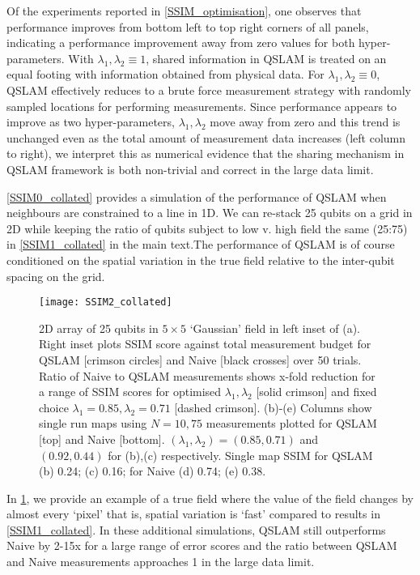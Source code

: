 Of the experiments reported in \cref{SSIM_optimisation}, one observes that performance improves from bottom left to top right corners of all panels, indicating a performance improvement away from zero values for both hyper-parameters.   With $\lambda_1, \lambda_2 \equiv 1$, shared information in QSLAM is treated on an equal footing with information obtained from physical data.  For $\lambda_1, \lambda_2 \equiv 0$, QSLAM effectively reduces to a brute force measurement strategy with randomly sampled locations for performing measurements. Since performance appears to improve as two hyper-parameters, $\lambda_1, \lambda_2$ move away from zero and this trend is unchanged even as the total amount of measurement data increases (left column to right), we interpret this as numerical evidence that the sharing mechanism in QSLAM framework is both non-trivial and correct in the large data limit. 

\cref{SSIM0_collated} provides a simulation of the performance of QSLAM when neighbours are constrained to a line in 1D. We can re-stack 25 qubits on a grid in 2D while keeping the ratio of qubits subject to low v. high field the same (25:75) in \cref{SSIM1_collated} in the main text.The performance of QSLAM is of course conditioned on the  spatial variation in the true field relative to the inter-qubit spacing on the grid.

\begin{figure}
	\texttt{[image: SSIM2\_collated]}
	\caption{\label{SSIM2_collated} 2D array of 25 qubits in $5 \times 5$  `Gaussian' field in left inset of (a).  Right inset plots SSIM score against total measurement budget for QSLAM [crimson circles] and Naive [black crosses] over 50 trials. Ratio of Naive to QSLAM measurements shows x-fold reduction for a range of SSIM scores for optimised $\lambda_1, \lambda_2$ [solid crimson] and fixed choice $\lambda_1 = 0.85, \lambda_2 = 0.71$ [dashed crimson]. (b)-(e) Columns show single run maps using $N=10, 75$ measurements plotted for QSLAM [top] and Naive [bottom]. $(\lambda_1, \lambda_2)= (0.85, 0.71)$ and $ (0.92, 0.44)$ for (b),(c) respectively. Single map SSIM for QSLAM (b) 0.24; (c) 0.16; for Naive (d) 0.74;  (e) 0.38.}    	
\end{figure} 
\FloatBarrier
In \cref{SSIM2_collated}, we provide an example of a true field where the value of the field changes by almost every `pixel' that is, spatial variation is `fast' compared to results in \cref{SSIM1_collated}. In these additional simulations, QSLAM still outperforms Naive by 2-15x for a large range of error scores and the ratio between QSLAM and Naive measurements approaches 1 in the large data limit. 

